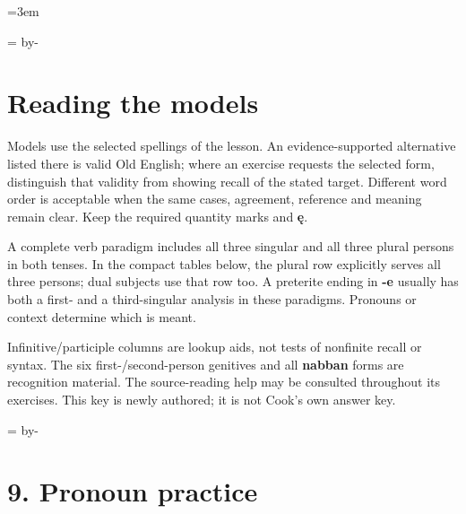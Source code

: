 \newcommand{\runningtitle}{Unit 2. Answer key}

\emergencystretch=3em
\newcommand{\itempara}[2]{\par\addvspace{3pt}\noindent\hangindent=1.8em\hangafter=1\makebox[1.8em][l]{#1.}#2\par}
\newcommand{\reserve}[1]{\par\begingroup\dimen0=\pagegoal\advance\dimen0 by-\pagetotal\ifdim\dimen0<#1\newpage\fi\endgroup}

\raggedright
{}

\reserve{7\baselineskip}
\section*{Reading the models}

Models use the selected spellings of the lesson. An evidence-supported alternative listed there is valid Old English; where an exercise requests the selected form, distinguish that validity from showing recall of the stated target. Different word order is acceptable when the same cases, agreement, reference and meaning remain clear. Keep the required quantity marks and \textbf{ę}.

A complete verb paradigm includes all three singular and all three plural persons in both tenses. In the compact tables below, the plural row explicitly serves all three persons; dual subjects use that row too. A preterite ending in \textbf{-e} usually has both a first- and a third-singular analysis in these paradigms. Pronouns or context determine which is meant.

Infinitive/\allowbreak{}participle columns are lookup aids, not tests of nonfinite recall or syntax. The six first-/\allowbreak{}second-person genitives and all \textbf{nabban} forms are recognition material. The source-reading help may be consulted throughout its exercises. This key is newly authored; it is not Cook’s own answer key.

\reserve{7\baselineskip}
\section*{9. Pronoun practice}

